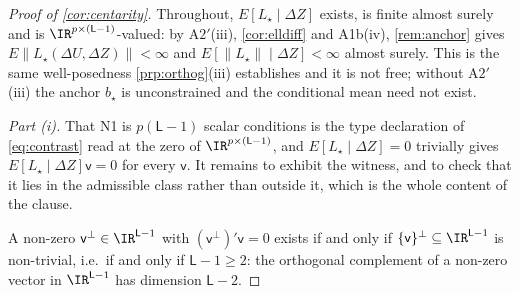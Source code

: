 \begin{proof}[Proof of \cref{cor:centarity}]
Throughout, $E[L_\star\mid\Delta Z]$ exists, is finite almost surely and is
$\IR^{p\times(\mathsf L-1)}$-valued: by A$2'$(iii), \cref{cor:elldiff} and A1b(iv), \cref{rem:anchor}
gives $E\|L_\star(\Delta U,\Delta Z)\|<\infty$ and $E[\|L_\star\|\mid\Delta Z]<\infty$ almost surely.
This is the same well-posedness \cref{prp:orthog}\textup{(iii)} establishes and it is not free; without
A$2'$(iii) the anchor $b_\star$ is unconstrained and the conditional mean need not exist.

\emph{Part (i).} That N1 is $p(\mathsf L-1)$ scalar conditions is the type declaration of
\eqref{eq:contrast} read at the zero of $\IR^{p\times(\mathsf L-1)}$, and
$E[L_\star\mid\Delta Z]=0$ trivially gives $E[L_\star\mid\Delta Z]\mathsf v=0$ for every
$\mathsf v$. It remains to exhibit the witness, and to check that it lies in the admissible class rather
than outside it, which is the whole content of the clause.

A non-zero $\mathsf v^{\perp}\in\IR^{\mathsf L-1}$ with $(\mathsf v^{\perp})'\mathsf v=0$ exists if and
only if $\{\mathsf v\}^{\perp}\subseteq\IR^{\mathsf L-1}$ is non-trivial, i.e.\ if and only if
$\mathsf L-1\ge2$: the orthogonal complement of a non-zero vector in $\IR^{\mathsf L-1}$ has dimension
$\mathsf L-2$.


\end{proof}
